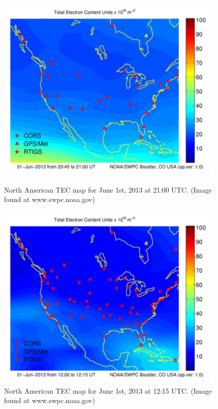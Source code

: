 \begin{figure}[htb]
\centering
\begin{minipage}[b]{0.48\textwidth}
\centering
\includegraphics[width=0.95\linewidth]{Ionosphere/figures/NA_TEC_day.png}
\caption{North American TEC map for June 1st, 2013 at 21:00 UTC. (Image found at www.swpc.noaa.gov)   }
\label{Fig:day_TEC_NA}
\end{minipage}%
\begin{minipage}[b]{0.02\textwidth}
\hspace{1cm}
\end{minipage}%
\begin{minipage}[b]{0.48\textwidth}
\centering
\includegraphics[width=0.95\linewidth]{Ionosphere/figures/NA_TEC_night.png}
\caption{North American TEC map for June 1st, 2013 at 12:15 UTC. (Image found at www.swpc.noaa.gov) }
\label{Fig:night_TEC_NA}
\end{minipage}
\end{figure}

